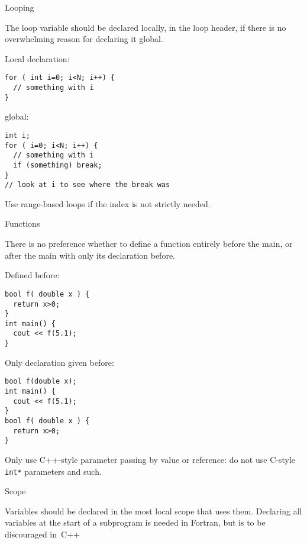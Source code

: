 
 {Looping}

The loop variable should be declared locally,
in the loop header,
if there is no overwhelming reason for declaring it global.
\begin{multicols}{2}
Local declaration:
\begin{lstlisting}
for ( int i=0; i<N; i++) {
  // something with i
}
\end{lstlisting}
\columnbreak
global:
\begin{lstlisting}
int i;
for ( i=0; i<N; i++) {
  // something with i
  if (something) break;
}
// look at i to see where the break was
\end{lstlisting}
\end{multicols}

Use range-based loops if the index is not strictly needed.

 {Functions}

There is no preference whether to define a function entirely before the main,
or after the main with only its declaration before.

\begin{multicols}{2}
Defined before:
\begin{lstlisting}
bool f( double x ) { 
  return x>0;
}
int main() {
  cout << f(5.1);
}
\end{lstlisting}
\columnbreak
Only declaration given before:
\begin{lstlisting}
bool f(double x);
int main() {
  cout << f(5.1);
}
bool f( double x ) { 
  return x>0;
}
\end{lstlisting}
\end{multicols}

Only use C++-style parameter passing by value or reference:
do not use C-style \lstinline+int*+ parameters and such.

 {Scope}

Variables should be declared in the most local scope that uses them.
Declaring all variables at the start of a subprogram is needed in Fortran,
but is to be discouraged in~C++

\begin{comment}
\Level 1 {Structures}

Do not declare a single global structure:
\begin{multicols}{2}
Good:
\begin{lstlisting}
struct Point { double x,y; } ;
int main() {
  Point mypoint;
  cin >> mypoint.x;
\end{lstlisting}
\columnbreak
Not good:
\begin{lstlisting}
struct Point { double x,y; } mypoint;
int main() {
  cin >> mypoint.x;
\end{lstlisting}
\end{multicols}
\end{comment}

